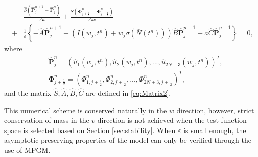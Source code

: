 \begin{equation}
    \begin{aligned}
        &\frac{\hat{S}(\hat{\mathbf{P}}^{n+1}_{j}-\hat{\mathbf{P}}^n_{j})}{\Delta t}+\frac{\hat{S}(\mathbf{\Phi}_{j+\frac{1}{2}}^n-\mathbf{\Phi}_{j-\frac{1}{2}}^n)}{\Delta w}\\
        +&\frac{1}{\varepsilon}\left\{-\hat{A}\hat{\mathbf{P}}^{n+1}_{j}+\left(I(w_{j},t^n)+w_{j}\sigma(\bar{N}(t^n))\right)\hat{B}\hat{\mathbf{P}}^{n+1}_{j}-a\hat{C}\hat{\mathbf{P}}^{n+1}_{j}\right\}=0,
    \end{aligned}
\end{equation}
where 
\begin{equation}
    \begin{aligned}
    &\hat{\mathbf{P}}^n_j=\left(\hat{u}_1(w_j,t^n),\hat{u}_2(w_j,t^n),...,\hat{u}_{2N+3}(w_j,t^n)\right)^T,\\
        &\mathbf{\Phi}_{j+\frac{1}{2}}^n=(\Phi_{1, j+\frac{1}{2}}^{n},\Phi_{2, j+\frac{1}{2}}^{n},...,\Phi_{2N+3, j+\frac{1}{2}}^{n})^T,
    \end{aligned}
\end{equation}
 and the matrix $\hat{S},\hat{A},\hat{B},\hat{C}$ are defined in \eqref{eq:Matrix2}.

 
This numerical scheme is conserved naturally in the $w$ direction, however, strict conservation of mass in the $v$ direction is not achieved when the test function space is selected based on Section \ref{sec:stability}. When $\varepsilon$ is small enough, the asymptotic preserving properties of the model can only be verified through the use of MPGM.

 